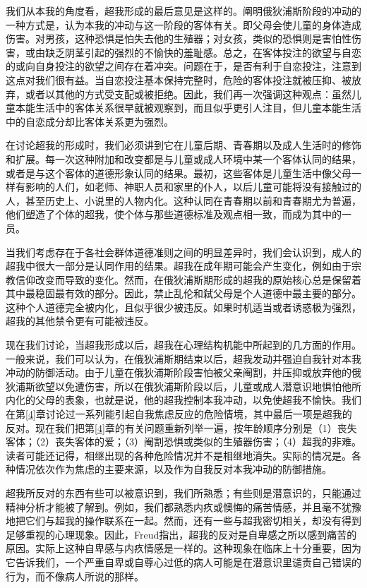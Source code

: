 \documentclass[UTF8,10pt,a4paper,openany]{book}
\begin{document}
我们从本我的角度看，超我形成的最后意见是这样的。阐明俄狄浦斯阶段的冲动的一种方式是，认为本我的冲动与这一阶段的客体有关。即父母会使儿童的身体造成伤害。对男孩，这种恐惧是怕失去他的生殖器；对女孩，类似的恐惧则是害怕性伤害，或由缺乏阴茎引起的强烈的不愉快的羞耻感。总之，在客体投注的欲望与自恋的或向自身投注的欲望之间存在着冲突。问题在于，是否有利于自恋投注，注意到这点对我们很有益。当自恋投注基本保持完整时，危险的客体投注就被压抑、被放弃，或者以其他的方式受支配或被拒绝。因此，我们再一次强调这种观点：虽然儿童本能生活中的客体关系很早就被观察到，而且似乎更引人注目，但儿童本能生活中的自恋成分却比客体关系更为强烈。

在讨论超我的形成时，我们必须讲到它在儿童后期、青春期以及成人生活时的修饰和扩展。每一次这种附加和改变都是与儿童或成人环境中某一个客体认同的结果，或者是与这个客体的道德形象认同的结果。最初，这些客体是儿童生活中像父母一样有影响的人们，如老师、神职人员和家里的仆人，以后儿童可能将没有接触过的人，甚至历史上、小说里的人物内化。这种认同在青春期以前和青春期尤为普遍，他们塑造了个体的超我，使个体与那些道德标准及观点相一致，而成为其中的一员。

当我们考虑存在于各社会群体道德准则之间的明显差异时，我们会认识到，成人的超我中很大一部分是认同作用的结果。超我在成年期可能会产生变化，例如由于宗教信仰改变而导致的变化。然而，在俄狄浦斯期形成的超我的原始核心总是保留着其中最稳固最有效的部分。因此，禁止乱伦和弑父母是个人道德中最主要的部分。这种个人道德完全被内化，且似乎很少被违反。如果时机适当或者诱惑极为强烈，超我的其他禁令更有可能被违反。

现在我们讨论，当超我形成以后，超我在心理结构机能中所起到的几方面的作用。一般来说，我们可以认为，在俄狄浦斯期结束以后，超我发动并强迫自我针对本我冲动的防御活动。由于儿童在俄狄浦斯阶段害怕被父亲阉割，并压抑或放弃他的俄狄浦斯欲望以免遭伤害，所以在俄狄浦斯阶段以后，儿童或成人潜意识地惧怕他所内化的父母的表象，也就是说，他的超我控制本我冲动，以免使超我不愉快。我们在第\ref{4}章讨论过一系列能引起自我焦虑反应的危险情境，其中最后一项是超我的反对。现在我们把第\ref{4}章的有关问题重新列举一遍，按年龄顺序分别是（1）丧失客体；（2）丧失客体的爱；（3）阉割恐惧或类似的生殖器伤害；（4）超我的非难。读者可能还记得，相继出现的各种危险情况并不是相继地消失。实际的情况是。各种情况依次作为焦虑的主要来源，以及作为自我反对本我冲动的防御措施。

超我所反对的东西有些可以被意识到，我们所熟悉；有些则是潜意识的，只能通过精神分析才能被了解到。例如，我们都熟悉内疚或懊悔的痛苦情感，并且毫不犹豫地把它们与超我的操作联系在一起。然而，还有一些与超我密切相关，却没有得到足够重视的心理现象。因此，Freud指出，超我的反对是自卑感之所以感到痛苦的原因。实际上这种自卑感与内疚情感是一样的。这种现象在临床上十分重要，因为它告诉我们，一个严重自卑或自尊心过低的病人可能是在潜意识里谴责自己错误的行为，而不像病人所说的那样。
\end{document}
